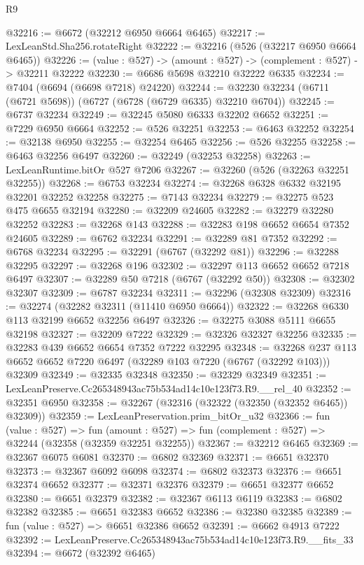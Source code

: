 \begin{lexlean}{R9}
\begin{coremodule}
@32216 := @6672 (@32212 @6950 @6664 @6465)
@32217 := LexLeanStd.Sha256.rotateRight
@32222 := @32216 (@526 (@32217 @6950 @6664 @6465))
@32226 := (value : @527) -> (amount : @527) -> (complement : @527) -> @32211 @32222
@32230 := @6686 @5698 @32210 @32222 @6335
@32234 := @7404 (@6694 (@6698 @7218) @24220)
@32244 := @32230 @32234 (@6711 (@6721 @5698)) (@6727 (@6728 (@6729 @6335) @32210 @6704))
@32245 := @6737 @32234
@32249 := @32245 @5080 @6333 @32202 @6652
@32251 := @7229 @6950 @6664
@32252 := @526 @32251
@32253 := @6463 @32252
@32254 := @32138 @6950
@32255 := @32254 @6465
@32256 := @526 @32255
@32258 := @6463 @32256 @6497
@32260 := @32249 (@32253 @32258)
@32263 := LexLeanRuntime.bitOr @527 @7206
@32267 := @32260 (@526 (@32263 @32251 @32255))
@32268 := @6753 @32234
@32274 := @32268 @6328 @6332 @32195 @32201 @32252 @32258
@32275 := @7143 @32234
@32279 := @32275 @523 @475 @6655 @32194
@32280 := @32209 @24605
@32282 := @32279 @32280 @32252
@32283 := @32268 @143
@32288 := @32283 @198 @6652 @6654 @7352 @24605
@32289 := @6762 @32234
@32291 := @32289 @81 @7352
@32292 := @6768 @32234
@32295 := @32291 (@6767 (@32292 @81))
@32296 := @32288 @32295
@32297 := @32268 @196
@32302 := @32297 @113 @6652 @6652 @7218 @6497
@32307 := @32289 @50 @7218 (@6767 (@32292 @50))
@32308 := @32302 @32307
@32309 := @6787 @32234
@32311 := @32296 (@32308 @32309)
@32316 := @32274 (@32282 @32311 (@11410 @6950 @6664))
@32322 := @32268 @6330 @113 @32199 @6652 @32256 @6497
@32326 := @32275 @3088 @5111 @6655 @32198
@32327 := @32209 @7222
@32329 := @32326 @32327 @32256
@32335 := @32283 @439 @6652 @6654 @7352 @7222 @32295
@32348 := @32268 @237 @113 @6652 @6652 @7220 @6497 (@32289 @103 @7220 (@6767 (@32292 @103))) @32309
@32349 := @32335 @32348
@32350 := @32329 @32349
@32351 := LexLeanPreserve.Cc265348943ac75b534ad14c10e123f73.R9.__rel_40
@32352 := @32351 @6950
@32358 := @32267 (@32316 (@32322 (@32350 (@32352 @6465)) @32309))
@32359 := LexLeanPreservation.prim_bitOr_u32
@32366 := fun (value : @527) =>
  fun (amount : @527) => fun (complement : @527) => @32244 (@32358 (@32359 @32251 @32255))
@32367 := @32212 @6465
@32369 := @32367 @6075 @6081
@32370 := @6802 @32369
@32371 := @6651 @32370
@32373 := @32367 @6092 @6098
@32374 := @6802 @32373
@32376 := @6651 @32374 @6652
@32377 := @32371 @32376
@32379 := @6651 @32377 @6652
@32380 := @6651 @32379
@32382 := @32367 @6113 @6119
@32383 := @6802 @32382
@32385 := @6651 @32383 @6652
@32386 := @32380 @32385
@32389 := fun (value : @527) => @6651 @32386 @6652
@32391 := @6662 @4913 @7222
@32392 := LexLeanPreserve.Cc265348943ac75b534ad14c10e123f73.R9.__fits_33
@32394 := @6672 (@32392 @6465)

\end{coremodule}
\end{lexlean}

